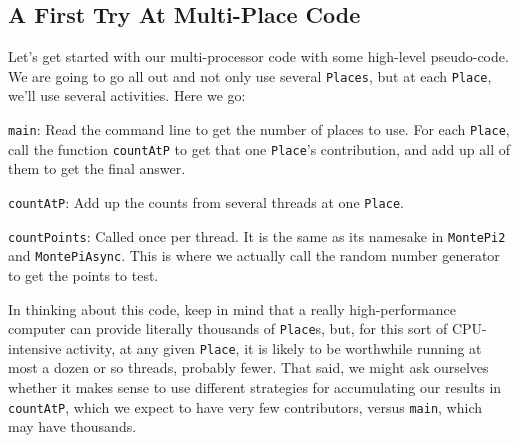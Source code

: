 \subsection{A First Try At Multi-Place Code}\label{ssec:montepierror}
Let's get started with our multi-processor code with some high-level pseudo-code.
We are going to go all out and not only use several {\tt Places}, but at each
{\tt Place}, we'll use several activities.  Here we go:
\begin{description}\label{lbl:mpchl}
\item{\tt main}:
      Read the command line to get the number of places to use.
      For each {\tt Place}, call the function {\tt countAtP} to get
      that one {\tt Place}'s contribution, and add up all of them
      to get the final answer.
\item{\tt countAtP}:
      Add up the counts from several threads at one {\tt Place}. 
\item{\tt countPoints}:
      Called once per thread.  It is the same as its namesake in
      {\tt MontePi2} and {\tt MontePiAsync}.  This is where we actually call
      the random number generator to get the points to test.
\end{description}

In thinking about this code, keep in mind that a really high-performance computer
can provide literally thousands of {\tt Place}s, but,
for this sort of CPU-intensive activity, at any given {\tt Place}, it is likely
to be worthwhile running at most a dozen or so threads, probably fewer.  That
said, we might ask ourselves whether it makes sense to use different strategies
for accumulating our results in {\tt countAtP},  which we expect to have very
few contributors, versus {\tt main}, which may have thousands.

